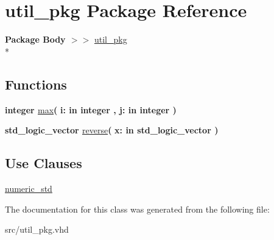 \hypertarget{classutil__pkg}{\section{util\-\_\-pkg Package Reference}
\label{classutil__pkg}
}
{\bfseries Package Body $>$$>$ }\hyperlink{class__util__pkg}{util\-\_\-pkg}\\*
\subsection*{Functions}
 \begin{DoxyCompactItemize}
\item 
\hypertarget{classutil__pkg_a75d57d42f413f4f44fe472e114c76b50}{{\bfseries {\bfseries \textcolor{comment}{integer}\textcolor{vhdlchar}{ }}} \hyperlink{classutil__pkg_a75d57d42f413f4f44fe472e114c76b50}{max}{\bfseries  ( }{\bfseries \textcolor{vhdlchar}{i\-: }\textcolor{stringliteral}{in }{\bfseries \textcolor{comment}{integer}\textcolor{vhdlchar}{ }}}{\bfseries  , \textcolor{vhdlchar}{j\-: }\textcolor{stringliteral}{in }{\bfseries \textcolor{comment}{integer}\textcolor{vhdlchar}{ }}}{\bfseries  )} }\label{classutil__pkg_a75d57d42f413f4f44fe472e114c76b50}

\item 
\hypertarget{classutil__pkg_a9abf89c3351a7e2c76ffa1943ab815e0}{{\bfseries {\bfseries \textcolor{comment}{std\-\_\-logic\-\_\-vector}\textcolor{vhdlchar}{ }}} \hyperlink{classutil__pkg_a9abf89c3351a7e2c76ffa1943ab815e0}{reverse}{\bfseries  ( }{\bfseries \textcolor{vhdlchar}{x\-: }\textcolor{stringliteral}{in }{\bfseries \textcolor{comment}{std\-\_\-logic\-\_\-vector}\textcolor{vhdlchar}{ }}}{\bfseries  )} }\label{classutil__pkg_a9abf89c3351a7e2c76ffa1943ab815e0}

\end{DoxyCompactItemize}
\subsection*{Use Clauses}
 \begin{DoxyCompactItemize}
\item 
\hypertarget{classutil__pkg_a2edc34402b573437d5f25fa90ba4013e}{\hyperlink{classutil__pkg_a2edc34402b573437d5f25fa90ba4013e}{numeric\-\_\-std}   }\label{classutil__pkg_a2edc34402b573437d5f25fa90ba4013e}

\end{DoxyCompactItemize}


The documentation for this class was generated from the following file\-:\begin{DoxyCompactItemize}
\item 
src/util\-\_\-pkg.\-vhd\end{DoxyCompactItemize}
